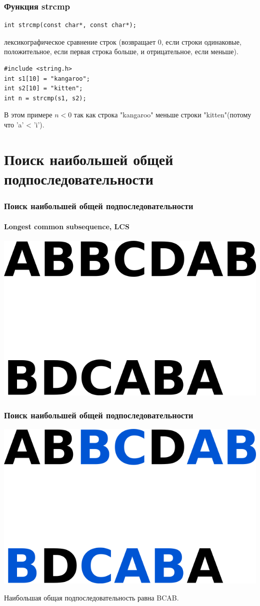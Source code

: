 \documentclass[12pt,pdf,hyperref={unicode}]{beamer}
\begin{document}
\begin{frame}[fragile]
\frametitle{Функция strcmp} 
\begin{lstlisting}
int strcmp(const char*, const char*);
\end{lstlisting}
лексикографическое сравнение строк (возвращает 0, если строки одинаковые, положительное, если первая строка больше, и отрицательное, если меньше).
\begin{lstlisting}
#include <string.h>
int s1[10] = "kangaroo";
int s2[10] = "kitten";
int n = strcmp(s1, s2);
\end{lstlisting}
В этом примере $n < 0$ так как строка "kangaroo" меньше строки "kitten"(потому что 'a' < 'i').
\end{frame}


\section{Поиск наибольшей общей подпоследовательности}
\begin{frame}[fragile]
\frametitle{Поиск наибольшей общей подпоследовательности} 
\framesubtitle{Longest common subsequence, LCS}
\begin{center}
\includegraphics[width=0.40\linewidth]{images/lcs1.png}
\end{center}
\end{frame}

\begin{frame}[fragile]
\frametitle{Поиск наибольшей общей подпоследовательности} 
\begin{center}
\includegraphics[width=0.40\linewidth]{images/lcs2.png}
\end{center}
Наибольшая общая подпоследовательность равна BCAB.
\end{frame}
\end{document}
